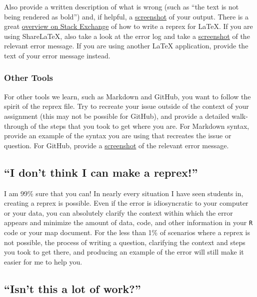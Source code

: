 \documentclass[]{book}
\theoremstyle{definition}
\theoremstyle{definition}
\theoremstyle{definition}
\theoremstyle{remark}
\begin{document}
Also provide a written description of what is wrong (such as ``the text
is not being rendered as bold'') and, if helpful, a
\href{https://www.take-a-screenshot.org}{screenshot} of your output.
There is a great
\href{https://tex.meta.stackexchange.com/questions/228/ive-just-been-asked-to-write-a-minimal-example-what-is-that}{overview
on Stack Exchange} of how to write a reprex for LaTeX. If you are using
ShareLaTeX, also take a look at the error log and take a
\href{https://www.take-a-screenshot.org}{screenshot} of the relevant
error message. If you are using another LaTeX application, provide the
text of your error message instead.

\subsubsection{Other Tools}\label{other-tools}

For other tools we learn, such as Markdown and GitHub, you want to
follow the spirit of the reprex file. Try to recreate your issue outside
of the context of your assignment (this may not be possible for GitHub),
and provide a detailed walk-through of the steps that you took to get
where you are. For Markdown syntax, provide an example of the syntax you
are using that recreates the issue or question. For GitHub, provide a
\href{https://www.take-a-screenshot.org}{screenshot} of the relevant
error message.

\subsection{\texorpdfstring{``I don't think I can make a
reprex!''}{I don't think I can make a reprex!}}\label{i-dont-think-i-can-make-a-reprex}

I am 99\% sure that you can! In nearly every situation I have seen
students in, creating a reprex is possible. Even if the error is
idiosyncratic to your computer or your data, you can absolutely clarify
the context within which the error appears and minimize the amount of
data, code, and other information in your \texttt{R} code or your map
document. For the less than 1\% of scenarios where a reprex is not
possible, the process of writing a question, clarifying the context and
steps you took to get there, and producing an example of the error will
still make it easier for me to help you.

\subsection{\texorpdfstring{``Isn't this a lot of
work?''}{Isn't this a lot of work?}}\label{isnt-this-a-lot-of-work}
\end{document}
